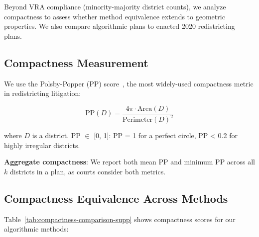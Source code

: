 
Beyond VRA compliance (minority-majority district counts), we analyze compactness to assess whether method equivalence extends to geometric properties. We also compare algorithmic plans to enacted 2020 redistricting plans.

\subsection{Compactness Measurement}

We use the Polsby-Popper (PP) score~\cite{polsby1991third}, the most widely-used compactness metric in redistricting litigation:

\[
\text{PP}(D) = \frac{4\pi \cdot \text{Area}(D)}{\text{Perimeter}(D)^2}
\]

where $D$ is a district. PP $\in$ [0, 1]: PP = 1 for a perfect circle, PP < 0.2 for highly irregular districts.

\textbf{Aggregate compactness}: We report both mean PP and minimum PP across all $k$ districts in a plan, as courts consider both metrics.

\subsection{Compactness Equivalence Across Methods}

Table~\ref{tab:compactness-comparison-supp} shows compactness scores for our algorithmic methods:

